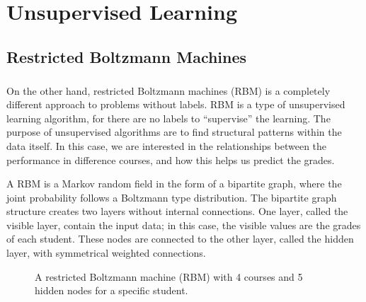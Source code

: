 
\chapter{Unsupervised Learning} \label{ch:unsupervised_learning}

\section{Restricted Boltzmann Machines} \label{sc:rbm}

\paragraph{}
On the other hand, restricted Boltzmann machines (RBM) is a
completely different approach to problems without labels.
RBM is a type of unsupervised learning algorithm, 
for there are no labels to ``supervise'' the learning.
The purpose of unsupervised algorithms are to find
structural patterns within the data itself.
In this case, we are interested in the relationships 
between the performance in difference courses,
and how this helps us predict the grades.

A RBM is a Markov random field in the form of a bipartite graph,
where the joint probability follows a Boltzmann type distribution.
The bipartite graph structure creates two layers without
internal connections.
One layer, called the visible layer, contain the input data; 
in this case, the visible values are the grades of each student.
These nodes are connected to the other layer, called the hidden layer,
with symmetrical weighted connections.
%
\def\layersep{2.5cm}
\begin{figure}[h]
\centering{}

\caption{\label{fig:RBM}
A restricted Boltzmann machine (RBM) with 4 courses and 5 hidden
nodes for a specific student.
}
\end{figure}

